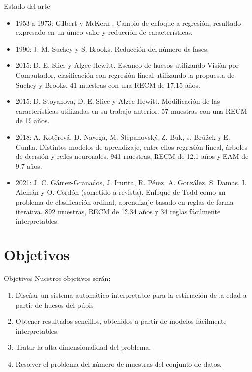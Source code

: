 \documentclass{beamer}
\begin{document}
\begin{frame}[allowframebreaks]{Estado del arte}

\begin{itemize}
\item 1953 a 1973: Gilbert y McKern \cite{propuestaGilbert}. Cambio de enfoque a regresión, resultado expresado en un único valor y reducción de características.

\item 1990: J. M. Suchey y S. Brooks. Reducción del número de fases.

\item 2015: D. E. Slice y Algee-Hewitt. Escaneo de huesos utilizando Visión por Computador, clasificación con regresión lineal utilizando la propuesta de Suchey y Brooks. 41 muestras con una RECM de 17.15 años.

\item 2015: D. Stoyanova, D. E. Slice y Algee-Hewitt. Modificación de las características utilizadas en su trabajo anterior. 57 muestras con una RECM de 19 años.

\item 2018: A. Kotěrová, D. Navega, M. Štepanovský, Z. Buk, J. Brůžek y E. Cunha. Distintos modelos de aprendizaje, entre ellos regresión lineal, árboles de decisión y redes neuronales. 941 muestras, RECM de 12.1 años y EAM de 9.7 años.

\item 2021: J. C. Gámez-Granados, J. Irurita, R. Pérez, A. González, S. Damas, I. Alemán y O. Cordón (sometido a revista). Enfoque de Todd como un problema de clasificación ordinal, aprendizaje basado en reglas de forma iterativa. 892 muestras, RECM de 12.34 años y 34 reglas fácilmente interpretables.

\end{itemize}

\end{frame}


\section{Objetivos}
\begin{frame}{Objetivos}
Nuestros objetivos serán:

\begin{enumerate}
	\item Diseñar un sistema automático interpretable para la estimación de la edad a partir de huesos del púbis.
	\item Obtener resultados sencillos, obtenidos a partir de modelos fácilmente interpretables.
	\item Tratar la alta dimensionalidad del problema.
	\item Resolver el problema del número de muestras del conjunto de datos.
\end{enumerate}

\end{frame}
\end{document}

